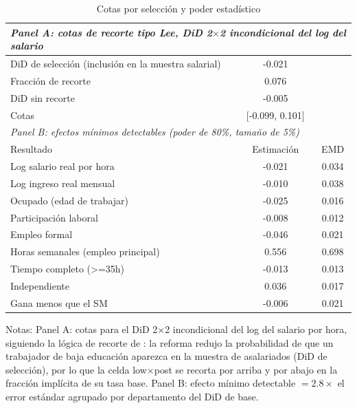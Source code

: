 \begin{table}[!tbp]\centering
\caption{Cotas por selección y poder estadístico}\label{tab:leemde}
\begin{threeparttable}
\footnotesize
\begin{tabular}{lcc}
\toprule
\multicolumn{3}{l}{\emph{Panel A: cotas de recorte tipo Lee, DiD 2$\times$2 incondicional del log del salario}} \\
\midrule
DiD de selección (inclusión en la muestra salarial) & -0.021 & \\
Fracción de recorte & 0.076 & \\
DiD sin recorte & -0.005 & \\
Cotas & [-0.099, 0.101] & \\
\midrule
\multicolumn{3}{l}{\emph{Panel B: efectos mínimos detectables (poder de 80\%, tamaño de 5\%)}} \\
Resultado & Estimación & EMD \\ \midrule
Log salario real por hora & -0.021 & 0.034 \\
Log ingreso real mensual & -0.010 & 0.038 \\
Ocupado (edad de trabajar) & -0.025 & 0.016 \\
Participación laboral & -0.008 & 0.012 \\
Empleo formal & -0.046 & 0.021 \\
Horas semanales (empleo principal) & 0.556 & 0.698 \\
Tiempo completo (>=35h) & -0.013 & 0.013 \\
Independiente & 0.036 & 0.017 \\
Gana menos que el SM & -0.006 & 0.021 \\
\bottomrule
\end{tabular}
\begin{tablenotes}\footnotesize
\item Notas: Panel A: cotas para el DiD 2$\times$2 incondicional del log del salario por hora, siguiendo la lógica de recorte de \citet{lee_2009}: la reforma redujo la probabilidad de que un trabajador de baja educación aparezca en la muestra de asalariados (DiD de selección), por lo que la celda low$\times$post se recorta por arriba y por abajo en la fracción implícita de su tasa base. Panel B: efecto mínimo detectable $=2.8\times$ el error estándar agrupado por departamento del DiD de base.
\end{tablenotes}
\end{threeparttable}\end{table}
